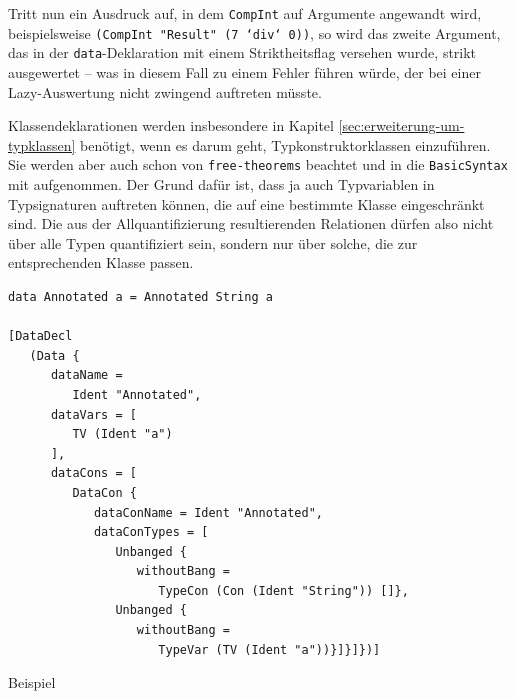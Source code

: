 Tritt nun ein Ausdruck auf, in dem \texttt{CompInt} auf Argumente angewandt wird, beispielsweise
\texttt{(CompInt "Result"\ (7 `div` 0))}, so wird das zweite Argument, das in der \texttt{data}-Deklaration mit einem Striktheitsflag
versehen wurde, strikt ausgewertet -- was in diesem Fall zu einem Fehler führen würde, der bei einer Lazy-Auswertung nicht
zwingend auftreten müsste.


Klassendeklarationen werden insbesondere in Kapitel \ref{sec:erweiterung-um-typklassen} benötigt, wenn es darum geht,
Typkonstruktorklassen einzuführen. Sie werden aber auch schon von \texttt{free-theorems} beachtet und in die \texttt{BasicSyntax}
mit aufgenommen. Der Grund dafür ist, dass ja auch
Typvariablen in Typsignaturen auftreten können, die auf eine bestimmte Klasse eingeschränkt sind. Die aus der Allquantifizierung
resultierenden Relationen dürfen also nicht über alle Typen quantifiziert sein, sondern nur über solche, die zur entsprechenden
Klasse passen.


\begin{listing}[ht]
\begin{verbatim}
data Annotated a = Annotated String a

[DataDecl
   (Data {
      dataName =
         Ident "Annotated",
      dataVars = [
         TV (Ident "a")
      ],
      dataCons = [
         DataCon {
            dataConName = Ident "Annotated",
            dataConTypes = [
               Unbanged {
                  withoutBang =
                     TypeCon (Con (Ident "String")) []},
               Unbanged {
                  withoutBang =
                     TypeVar (TV (Ident "a"))}]}]})]
\end{verbatim}
\caption{Beispiel}
\label{lst:ast-data}
\end{listing}


